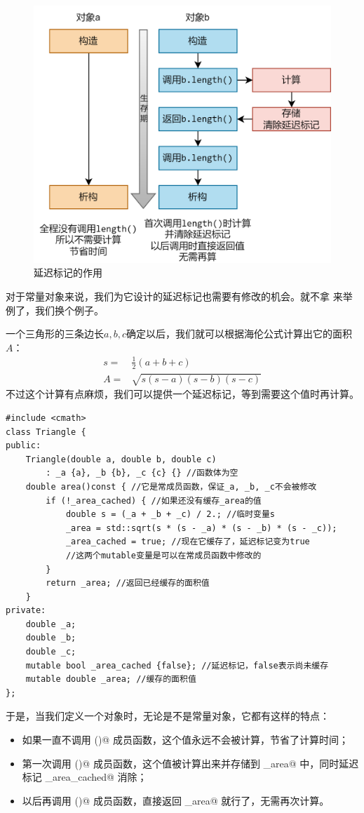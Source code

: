 \begin{figure}[htbp]
    \centering
    \includegraphics[width=.8\textwidth]{../images/generalized_parts/08_lazy_tag.drawio.png}
    \caption{延迟标记的作用}
\end{figure}
对于常量对象来说，我们为它设计的延迟标记也需要有修改的机会。就不拿 \lstinline@valarri@ 来举例了，我们换个例子。\par
一个三角形的三条边长$a, b, c$确定以后，我们就可以根据海伦公式计算出它的面积$A$：
\begin{align*}
s=&{}\frac12(a+b+c)\\
A=&{}\sqrt{s(s-a)(s-b)(s-c)}
\end{align*}
不过这个计算有点麻烦，我们可以提供一个延迟标记，等到需要这个值时再计算。
\begin{lstlisting}
#include <cmath>
class Triangle {
public:
    Triangle(double a, double b, double c)
        : _a {a}, _b {b}, _c {c} {} //函数体为空
    double area()const { //它是常成员函数，保证_a, _b, _c不会被修改
        if (!_area_cached) { //如果还没有缓存_area的值
            double s = (_a + _b + _c) / 2.; //临时变量s
            _area = std::sqrt(s * (s - _a) * (s - _b) * (s - _c));
            _area_cached = true; //现在它缓存了，延迟标记变为true
            //这两个mutable变量是可以在常成员函数中修改的
        }
        return _area; //返回已经缓存的面积值
    }
private:
    double _a;
    double _b;
    double _c;
    mutable bool _area_cached {false}; //延迟标记，false表示尚未缓存
    mutable double _area; //缓存的面积值
};
\end{lstlisting}\par
于是，当我们定义一个对象时，无论是不是常量对象，它都有这样的特点：
\begin{itemize}
    \item 如果一直不调用 \lstinline@area()@ 成员函数，这个值永远不会被计算，节省了计算时间；
    \item 第一次调用 \lstinline@area()@ 成员函数，这个值被计算出来并存储到 \lstinline@_area@ 中，同时延迟标记 \lstinline@_area_cached@ 消除；
    \item 以后再调用 \lstinline@area()@ 成员函数，直接返回 \lstinline@_area@ 就行了，无需再次计算。
\end{itemize}\par
